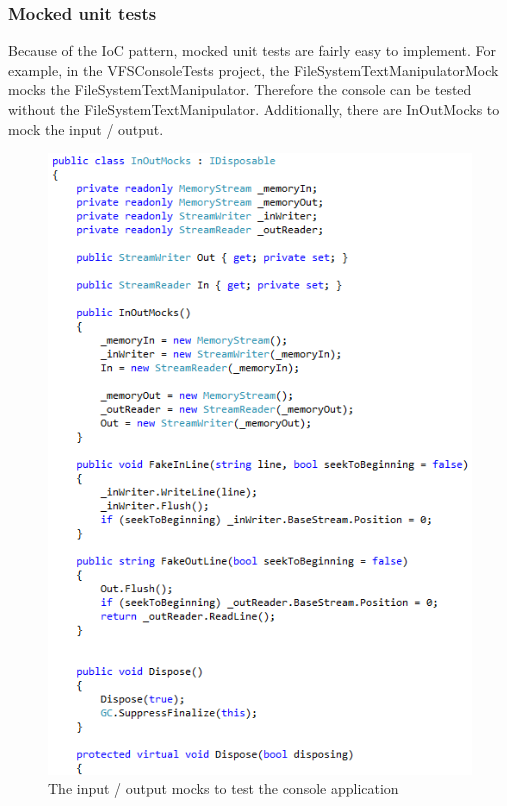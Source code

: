 \documentclass[JCDReport.tex]{subfiles}
\begin{document}
\subsubsection{Mocked unit tests}
Because of the IoC pattern, mocked unit tests are fairly easy to implement. For example, in the VFSConsoleTests project, the FileSystemTextManipulatorMock mocks the FileSystemTextManipulator. Therefore the console can be tested without the FileSystemTextManipulator. Additionally, there are InOutMocks to mock the input / output.
\begin{figure}[h!]
	\centering
	\includegraphics[scale=1]{Images/inoutmocks.png} 
	\caption{The input / output mocks to test the console application}
\end{figure}

\end{document}
